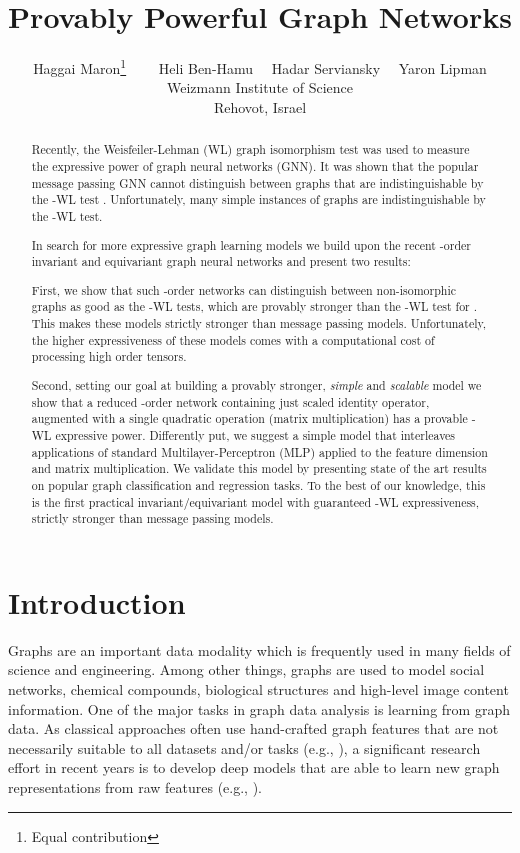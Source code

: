 \documentclass{article}
\title{Provably Powerful Graph Networks}
\author{
	Haggai Maron\thanks{Equal contribution} \ \ \   \  Heli Ben-Hamu \ \  Hadar Serviansky \ \ 	Yaron Lipman \\
Weizmann Institute of Science\\
	Rehovot, Israel \\
}
\newcommand{\eg}{{e.g.}}
\begin{document}
\maketitle

\begin{abstract}
Recently, the Weisfeiler-Lehman (WL) graph isomorphism test was used to measure the expressive power of graph neural networks (GNN). It was shown that the popular message passing GNN cannot distinguish between graphs that are indistinguishable by the -WL test \citep{morris2018weisfeiler,xu2018how}. Unfortunately, many simple instances of graphs are indistinguishable by the -WL test. 

In search for more expressive graph learning models we build upon the recent -order invariant and equivariant graph neural networks \citep{maron2018invariant, maron2019universality}  and present two results: 

First, we show that such -order networks can distinguish between non-isomorphic graphs as good as the -WL tests, which are provably stronger than the -WL test for . This makes these models strictly stronger than message passing models. Unfortunately, the higher expressiveness of these models comes with a computational cost of processing high order tensors. 

Second, setting our goal at building a provably stronger, \emph{simple} and \emph{scalable}  model we show that a reduced -order network containing just scaled identity operator, augmented with a single quadratic operation (matrix multiplication) has a provable -WL expressive power. Differently put, we suggest a simple model that interleaves applications of standard Multilayer-Perceptron (MLP) applied to the feature dimension and matrix multiplication. 
We validate this model by presenting state of the art results on popular graph classification and regression tasks. To the best of our knowledge, this is the first practical invariant/equivariant model with guaranteed -WL expressiveness, strictly stronger than message passing models.




\end{abstract}
\section{Introduction}








Graphs are an important data modality which is frequently used in many fields of science and engineering. Among other things, graphs are used to model social networks, chemical compounds, biological structures and high-level image content information. One of the major tasks in graph data analysis is learning from graph data. As classical approaches often use hand-crafted graph features that are not necessarily suitable to all datasets and/or tasks (\eg, \cite{kriege2019survey}), a significant research effort in recent years is to develop deep models that are able to learn new graph representations from raw features (\eg, \citet{Gori2005,Duvenaud2015,Niepert2016,kipf,Velickovic2017,monti2017geometric,Hamilton2017,morris2018weisfeiler,xu2018how}).
\end{document}
